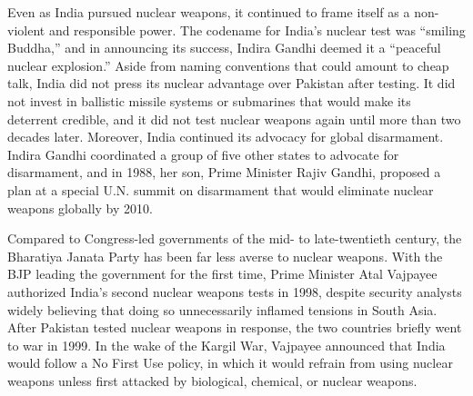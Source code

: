 \documentclass[12pt]{article}
\begin{document}
Even as India pursued nuclear weapons, it continued to frame itself as a non-violent and responsible power. The codename for India's nuclear test was “smiling Buddha,” and in announcing its success, Indira Gandhi deemed it a “peaceful nuclear explosion.” Aside from naming conventions that could amount to cheap talk, India did not press its nuclear advantage over Pakistan after testing. It did not invest in ballistic missile systems or submarines that would make its deterrent credible, and it did not test nuclear weapons again until more than two decades later. Moreover, India continued its advocacy for global disarmament. Indira Gandhi coordinated a group of five other states to advocate for disarmament, and in 1988, her son, Prime Minister Rajiv Gandhi, proposed a plan at a special U.N. summit on disarmament that would eliminate nuclear weapons globally by 2010. 

Compared to Congress-led governments of the mid- to late-twentieth century, the Bharatiya Janata Party has been far less averse to nuclear weapons. With the BJP leading the government for the first time, Prime Minister Atal Vajpayee authorized India's second nuclear weapons tests in 1998, despite security analysts widely believing that doing so unnecessarily inflamed tensions in South Asia. After Pakistan tested nuclear weapons in response, the two countries briefly went to war in 1999. In the wake of the Kargil War, Vajpayee announced that India would follow a No First Use policy, in which it would refrain from using nuclear weapons unless first attacked by biological, chemical, or nuclear weapons. 
\end{document}
